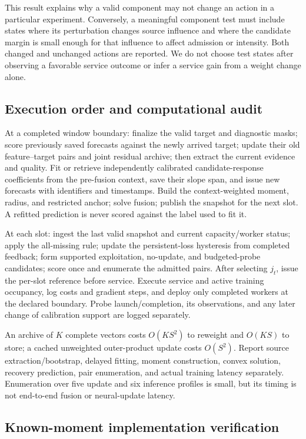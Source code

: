 \documentclass[10pt]{article}
\begin{document}
This result explains why a valid component may not change an action in a
particular experiment. Conversely, a meaningful component test must include
states where its perturbation changes source influence and where the candidate
margin is small enough for that influence to affect admission or intensity.
Both changed and unchanged actions are reported. We do not choose test states
after observing a favorable service outcome or infer a service gain from a
weight change alone.

\subsection{Execution order and computational audit}

At a completed window boundary: finalize the valid target and diagnostic masks;
score previously saved forecasts against the newly arrived target; update their
old feature--target pairs and joint residual archive; then extract the current
evidence and quality. Fit or retrieve independently calibrated candidate-response
coefficients from the pre-fusion context, save their slope span, and issue new
forecasts with identifiers and timestamps. Build the context-weighted moment,
radius, and restricted anchor; solve fusion; publish the snapshot for the next
slot. A refitted prediction is never scored against the label used to fit it.

At each slot: ingest the last valid snapshot and current capacity/worker status;
apply the all-missing rule; update the persistent-loss hysteresis from completed
feedback; form supported exploitation, no-update, and budgeted-probe candidates;
score once and enumerate the admitted pairs. After selecting $j_t$, issue the
per-slot reference before service. Execute service and active training occupancy,
log costs and gradient steps, and deploy only completed workers at the declared
boundary. Probe launch/completion, its observations, and any later change of
calibration support are logged separately.

An archive of $K$ complete vectors costs $O(KS^2)$ to reweight and $O(KS)$
to store; a cached unweighted outer-product update costs $O(S^2)$.
Report source extraction/bootstrap, delayed fitting, moment construction,
convex solution, recovery prediction, pair enumeration, and actual training
latency separately. Enumeration over five update and six inference profiles
is small, but its timing is not end-to-end fusion or neural-update latency.

\subsection{Known-moment implementation verification}
\label{sec:known-moment-verification}
\end{document}
